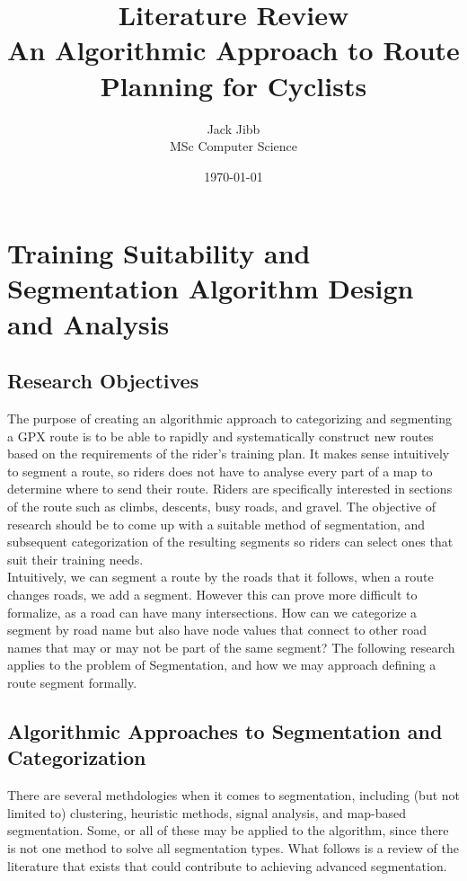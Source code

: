 \documentclass[12pt,a4paper]{report}
\title{Literature Review \\ \large An Algorithmic Approach to Route Planning for Cyclists}
\author{Jack Jibb \\ MSc Computer Science}
\date{\today}
\begin{document}
\maketitle

\tableofcontents
\newpage

\section{Training Suitability and Segmentation Algorithm Design and Analysis}

\subsection{Research Objectives}
The purpose of creating an algorithmic approach to categorizing and segmenting a GPX route is to be able to rapidly and systematically construct new routes based on the requirements of the rider's training plan.
It makes sense intuitively to segment a route, so riders does not have to analyse every part of a map to determine where to send their route. Riders are specifically interested in sections of the route such as climbs, descents, busy roads, and gravel.
The objective of research should be to come up with a suitable method of segmentation, and subsequent categorization of the resulting segments so riders can select ones that suit their training needs.
\\
Intuitively, we can segment a route by the roads that it follows, when a route changes roads, we add a segment. However this can prove more difficult to formalize, as
a road can have many intersections. How can we categorize a segment by road name but also have node values that connect to other road names that may or may not be part of the same segment?
The following research applies to the problem of Segmentation, and how we may approach defining a route segment formally.

\subsection{Algorithmic Approaches to Segmentation and Categorization}
There are several methdologies when it comes to segmentation, including (but not limited to) clustering, heuristic methods, signal analysis, and map-based segmentation. Some, or all of these may be
applied to the algorithm, since there is not one method to solve all segmentation types. What follows is a review of the literature that exists that could contribute to
achieving advanced segmentation.
\end{document}
